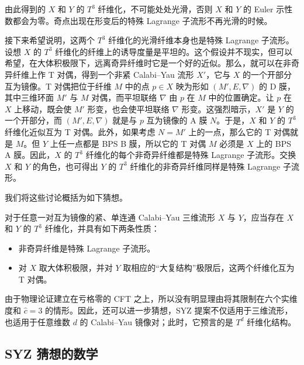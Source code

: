 由此得到的 $X$ 和 $Y$ 的 $T^3$ 纤维化，不可能处处光滑，否则 $X$ 和 $Y$ 的 Euler 示性数都会为零。奇点出现在形变后的特殊 Lagrange 子流形不再光滑的时候。

接下来希望说明，这两个 $T^3$ 纤维化的光滑纤维本身也是特殊 Lagrange 子流形。设想 $X$ 的 $T^3$ 纤维化的纤维上的诱导度量是平坦的。这个假设并不现实，但可以希望，在大体积极限下，远离奇异纤维时它是一个好的近似。那么，就可以在非奇异纤维上作 T 对偶，得到一个非紧 Calabi--Yau 流形 $X'$，它与 $X$ 的一个开部分互为镜像。T 对偶把位于纤维 $M$ 中的点 $p\in X$ 映为形如 $(M',E,\nabla)$ 的 D 膜，其中三维环面 $M'$ 与 $M$ 对偶，而平坦联络 $\nabla$ 由 $p$ 在 $M$ 中的位置确定。让 $p$ 在 $X$ 上移动，既会使 $M'$ 形变，也会使平坦联络 $\nabla$ 形变。这强烈暗示，$X'$ 是 $Y$ 的一个开部分，而 $(M',E,\nabla)$ 就是与 $p$ 互为镜像的 A 膜 $N$。于是，$X$ 和 $Y$ 的 $T^3$ 纤维化近似互为 T 对偶。此外，如果考虑 $N=M'$ 上的一点，那么它的 T 对偶就是 $M$。但 $Y$ 上任一点都是 BPS B 膜，所以它的 T 对偶 $M$ 必须是 $X$ 上的 BPS A 膜。因此，$X$ 的 $T^3$ 纤维化的每个非奇异纤维都是特殊 Lagrange 子流形。交换 $X$ 和 $Y$ 的角色，也可得出 $Y$ 的 $T^3$ 纤维化的非奇异纤维同样是特殊 Lagrange 子流形。

我们将这些讨论概括为如下猜想。

\begin{conjecture}\label{conj:1.5}
对于任意一对互为镜像的紧、单连通 Calabi--Yau 三维流形 $X$ 与 $Y$，应当存在 $X$ 和 $Y$ 的 $T^3$ 纤维化，并具有如下两条性质：
\begin{itemize}
\item 非奇异纤维是特殊 Lagrange 子流形。
\item 对 $X$ 取大体积极限，并对 $Y$ 取相应的“大复结构”极限后，这两个纤维化互为 T 对偶。
\end{itemize}
\end{conjecture}

由于物理论证建立在亏格零的 CFT 之上，所以没有明显理由将其限制在六个实维度和 $\hat{c}=3$ 的情形。因此，还可以进一步猜想，SYZ 提案不仅适用于三维流形，也适用于任意维数 $d$ 的 Calabi--Yau 镜像对；此时，它预言的是 $T^d$ 纤维化结构。

\subsection{SYZ 猜想的数学}\label{sec:1.3.3}


